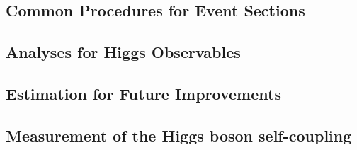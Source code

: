 


\subsection{Common Procedures for Event Sections}
\label{subsec:higgs_common}


\subsection{Analyses for Higgs Observables}
\label{subsec:higgs_ana}


% 

% 

%


\subsection{Estimation for Future Improvements}
\label{subsec:higgs_improve}


\subsection{Measurement of the Higgs boson self-coupling}
\label{subsec:higgsself}

